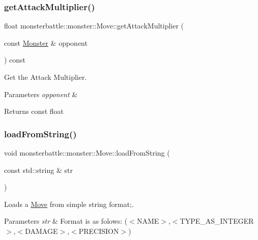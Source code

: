 \subsubsection{\texorpdfstring{get\+Attack\+Multiplier()}{getAttackMultiplier()}}
{\footnotesize\ttfamily float monsterbattle\+::monster\+::\+Move\+::get\+Attack\+Multiplier (\begin{DoxyParamCaption}\item[{const \hyperlink{classmonsterbattle_1_1monster_1_1Monster}{Monster} \&}]{opponent }\end{DoxyParamCaption}) const\hspace{0.3cm}{\ttfamily [protected]}}



Get the Attack Multiplier. 


\begin{DoxyParams}{Parameters}
{\em opponent} & \\
\hline
\end{DoxyParams}
\begin{DoxyReturn}{Returns}
const float 
\end{DoxyReturn}
\mbox{\label{classmonsterbattle_1_1monster_1_1Move_a60c469648f7e04e7bf3081d9e165003c}} 
\subsubsection{\texorpdfstring{load\+From\+String()}{loadFromString()}}
{\footnotesize\ttfamily void monsterbattle\+::monster\+::\+Move\+::load\+From\+String (\begin{DoxyParamCaption}\item[{const std\+::string \&}]{str }\end{DoxyParamCaption})}



Loads a \hyperlink{classmonsterbattle_1_1monster_1_1Move}{Move} from simple string format;. 


\begin{DoxyParams}{Parameters}
{\em str} & Format is as folows\+: ($<$\+N\+A\+M\+E$>$,$<$\+T\+Y\+P\+E\+\_\+\+A\+S\+\_\+\+I\+N\+T\+E\+G\+E\+R$>$,$<$\+D\+A\+M\+A\+G\+E$>$,$<$\+P\+R\+E\+C\+I\+S\+I\+O\+N$>$)\\
\hline
\end{DoxyParams}

